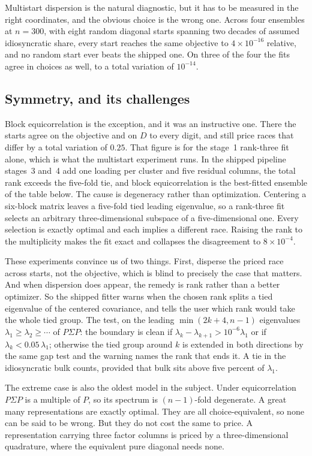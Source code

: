 \documentclass[11pt]{article}
\begin{document}
Multistart dispersion is the natural diagnostic, but it
has to be measured in the right coordinates, and the obvious choice is
the wrong one. Across four ensembles at $n=300$, with eight random diagonal starts
spanning two decades of assumed idiosyncratic share, every start reaches
the same objective to $4\times10^{-16}$ relative, and no random start
ever beats the shipped one. On three of the four the fits agree in
choices as well, to a total variation of $10^{-14}$.

\subsection{Symmetry, and its challenges}

Block equicorrelation is the exception, and it was an instructive one. There the
starts agree on the objective and on $D$ to every digit, and still price
races that differ by a total variation of $0.25$. That figure is for the
stage~1 rank-three fit alone, which is what the multistart experiment
runs. In the shipped pipeline stages~3 and~4 add one loading per cluster
and five residual columns, the total rank exceeds the five-fold tie, and
block equicorrelation is the best-fitted ensemble of the table below. The cause is degeneracy
rather than optimization. Centering a six-block matrix leaves a five-fold
tied leading eigenvalue, so a rank-three fit selects an arbitrary
three-dimensional subspace of a five-dimensional one. Every selection is
exactly optimal and each implies a different race. Raising the rank to
the multiplicity makes the fit exact and collapses the disagreement to
$8\times10^{-4}$.

These experiments convince us of two things. First, disperse the priced race across starts, not the objective, which is blind to precisely the case that matters. And when
dispersion does appear, the remedy is rank rather than a better
optimizer. So the shipped fitter warns when the chosen rank splits a tied
eigenvalue of the centered covariance, and tells the user which rank would take
the whole tied group. The test, on the leading $\min(2k+4,n-1)$
eigenvalues $\lambda_1\ge\lambda_2\ge\cdots$ of $P\Sigma P$: the boundary
is clean if $\lambda_k-\lambda_{k+1}>10^{-6}\lambda_1$ or if
$\lambda_k<0.05\,\lambda_1$; otherwise the tied group around $k$ is
extended in both directions by the same gap test and the warning names
the rank that ends it. A tie in the idiosyncratic bulk counts, provided
that bulk sits above five percent of $\lambda_1$.

The extreme case is also the oldest model in the subject. Under equicorrelation $P\Sigma P$ is a multiple of $P$, so its
spectrum is $(n-1)$-fold degenerate. A great many representations are
exactly optimal. They are all
choice-equivalent, so none can be said to be wrong. But they do not cost the same to
price. A representation carrying three factor columns is priced by a
three-dimensional quadrature, where the equivalent pure diagonal needs
none.
\end{document}
